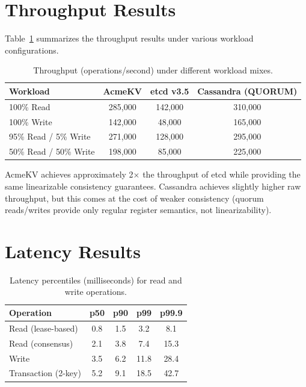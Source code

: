 \documentclass[12pt,a4paper]{report}
\begin{document}
\section{Throughput Results}

Table~\ref{tab:throughput} summarizes the throughput results under various workload configurations.

\begin{table}[H]
\centering
\caption{Throughput (operations/second) under different workload mixes.}
\label{tab:throughput}
\begin{tabular}{@{}lccc@{}}
\toprule
\textbf{Workload} & \textbf{AcmeKV} & \textbf{etcd v3.5} & \textbf{Cassandra (QUORUM)} \\
\midrule
100\% Read          & 285,000 & 142,000 & 310,000 \\
100\% Write         & 142,000 & 48,000  & 165,000 \\
95\% Read / 5\% Write  & 271,000 & 128,000 & 295,000 \\
50\% Read / 50\% Write & 198,000 & 85,000  & 225,000 \\
\bottomrule
\end{tabular}
\end{table}

AcmeKV achieves approximately 2$\times$ the throughput of etcd while providing the same linearizable consistency guarantees. Cassandra achieves slightly higher raw throughput, but this comes at the cost of weaker consistency (quorum reads/writes provide only regular register semantics, not linearizability).

\section{Latency Results}

\begin{table}[H]
\centering
\caption{Latency percentiles (milliseconds) for read and write operations.}
\label{tab:latency}
\begin{tabular}{@{}lcccc@{}}
\toprule
\textbf{Operation} & \textbf{p50} & \textbf{p90} & \textbf{p99} & \textbf{p99.9} \\
\midrule
Read (lease-based)  & 0.8 & 1.5 & 3.2 & 8.1 \\
Read (consensus)    & 2.1 & 3.8 & 7.4 & 15.3 \\
Write               & 3.5 & 6.2 & 11.8 & 28.4 \\
Transaction (2-key) & 5.2 & 9.1 & 18.5 & 42.7 \\
\bottomrule
\end{tabular}
\end{table}
\end{document}
